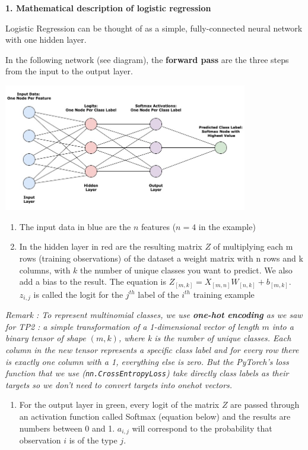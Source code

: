 \documentclass[10pt,a4paper]{article}
\providecommand{\tightlist}{%
  \setlength{\parskip}{0pt}
  }
\theoremstyle{break}
\begin{document}
\textbf{1. Mathematical description of logistic regression}

Logistic Regression can be thought of as a simple, fully-connected neural network with one hidden layer.

In the following network (see diagram), the \textbf{forward pass} are the three steps from the input to the output layer.

\begin{center}
\includegraphics[width=0.8\textwidth]{img/logistic_regression_diagram.jpg}
\end{center}

\begin{enumerate}
\def\labelenumi{\arabic{enumi}.}
\tightlist
\item
  The input data in blue are the \(n\) features (\(n =4\) in the example)
\item
  In the hidden layer in red are the resulting matrix \(Z\) of multiplying each m rows (training observations) of the dataset a weight matrix with n rows and k columns, with \(k\) the number of unique classes you want to predict. We also add a bias to the result. The equation is \(Z_{[m,k]} = X_{[m,n]} W_{[n,k]} + b_{[m,k]}\). \(z_{i,j}\) is called the logit for the \(j^{th}\) label of the \(i^{th}\) training example
\end{enumerate}

\emph{Remark : To represent multinomial classes, we use \textbf{one-hot encoding} as we saw for TP2 : a simple transformation of a 1-dimensional vector of length \(m\) into a binary tensor of shape \((m, k)\), where k is the number of unique classes. Each column in the new tensor represents a specific class label and for every row there is exactly one column with a 1, everything else is zero. But the PyTorch's loss function that we use (\texttt{nn.CrossEntropyLoss}) take directly class labels as their targets so we don't need to convert targets into onehot vectors.}

\begin{enumerate}
\def\labelenumi{\arabic{enumi}.}
\setcounter{enumi}{2}
\tightlist
\item
  For the output layer in green, every logit of the matrix \(Z\) are passed through an activation function called Softmax (equation below) and the results are numbers between 0 and 1. \(a_{i,j}\) will correspond to the probability that observation \(i\) is of the type \(j\).
\end{enumerate}
\end{document}
